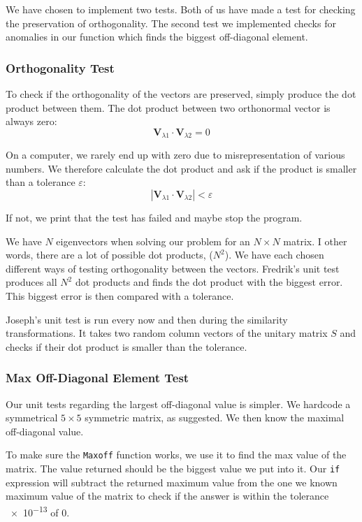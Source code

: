 \documentclass[11pt,a4paper]{article}
\newcommand\V[1]{\mathbf{#1}}                  %
\let\epsilon\varepsilon
\begin{document}
We have chosen to implement two tests. Both of us have made a test for checking the preservation of orthogonality. The second test we implemented checks for anomalies in our function which finds the biggest off-diagonal element.

\subsubsection{Orthogonality Test}

To check if the orthogonality of the vectors are preserved, simply produce the dot product between them. The dot product between two orthonormal vector is always zero:
\begin{equation}
  \V{V}_{\lambda1} \cdot \V{V}_{\lambda2} = 0
\end{equation}

On a computer, we rarely end up with zero due to misrepresentation of various numbers. We therefore calculate the dot product and ask if the product is smaller than a tolerance $\epsilon$:
\begin{equation}
  \left| \V{V}_{\lambda1} \cdot \V{V}_{\lambda2} \right| < \epsilon
\end{equation}

If not, we print that the test has failed and maybe stop the program.

We have $N$ eigenvectors when solving our problem for an $N \times N$ matrix. I other words, there are a lot of possible dot products, ($N^2$). We have each chosen different ways of testing orthogonality between the vectors.
Fredrik's unit test produces all $N^2$ dot products and finds the dot product with the biggest error. This biggest error is then compared with a tolerance.

Joseph's unit test is run every now and then during the similarity transformations. It takes two random column vectors of the unitary matrix $S$ and checks if their dot product is smaller than the tolerance.

\subsubsection{Max Off-Diagonal Element Test}

Our unit tests regarding the largest off-diagonal value is simpler. We hardcode a symmetrical $5 \times 5$ symmetric matrix, as suggested. We then know the maximal off-diagonal value.

To make sure the \texttt{Maxoff} function works, we use it to find the max value of the matrix. The value returned should be the biggest value we put into it. Our \texttt{if} expression
will subtract the returned maximum value from the one we known maximum value of the matrix to check if the answer is within the tolerance \num{e-13} of $0$.
\end{document}
